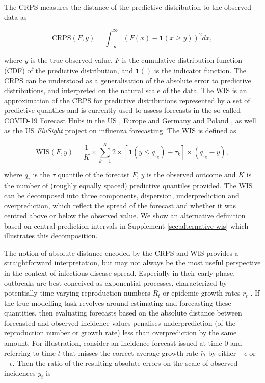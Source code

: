 \documentclass{article}
\begin{document}
The CRPS measures the distance of the predictive distribution to the observed data as 
\begin{linenomath*}
\begin{equation}
    \text{CRPS}(F, y) = \int_{-\infty}^\infty \left( F(x) - \boldsymbol{1}(x \geq y) \right)^2 dx,
\end{equation}    
\end{linenomath*}
where $y$ is the true observed value, $F$ is the cumulative distribution function (CDF) of the predictive distribution, and $\boldsymbol{1}()$ is the indicator function. The CRPS can be understood as a generalisation of the absolute error to predictive distributions, and interpreted on the natural scale of the data. The WIS is an approximation of the CRPS for predictive distributions represented by a set of predictive quantiles and is currently used to assess forecasts in the so-called COVID-19 Forecast Hubs in the US \citep{cramerCOVID19ForecastHub2020, cramerEvaluationIndividualEnsemble2021}, Europe \citep{sherrattPredictivePerformanceMultimodel2022} and Germany and Poland \citep{bracherShorttermForecastingCOVID192021, bracherNationalSubnationalShortterm2021}, as well as the US \textit{FluSight} project on influenza forecasting\citep{CdcepiFlusightforecastdata2022}. The WIS is defined as 
\begin{linenomath*}
\begin{equation}
    \text{WIS}(F, y) = \frac{1}{K} \times \sum_{k = 1}^{K} 2 \times \left[ \boldsymbol{1}(y \leq q_{\tau_k}) - \tau_k \right] \times ( q_{\tau_k} - y), 
\end{equation}
\end{linenomath*}
where $q_{\tau}$ is the $\tau$ quantile of the forecast $F$, $y$ is the observed outcome and $K$ is the number of (roughly equally spaced) predictive quantiles provided. The WIS can be decomposed into three components, dispersion, underprediction and overprediction, which reflect the spread of the forecast and whether it was centred above or below the observed value. We show an alternative definition based on central prediction intervals in Supplement \ref{sec:alternative-wis} which illustrates this decomposition. 

The notion of absolute distance encoded by the CRPS and WIS provides a straightforward interpretation, but may not always be the most useful perspective in the context of infectious disease spread. Especially in their early phase, outbreaks are best conceived as exponential processes, characterized by potentially time varying reproduction numbers $R_t$ \citep{gosticPracticalConsiderationsMeasuring2020} or epidemic growth rates $r_t$ \citep{dushoffSpeedStrengthEpidemic2021}. If the true modelling task revolves around estimating and forecasting these quantities, then evaluating forecasts based on the absolute distance between forecasted and observed incidence values penalises underprediction (of the reproduction number or growth rate) less than overprediction by the same amount. For illustration, consider an incidence forecast issued at time 0 and referring to time $t$ that misses the correct average growth rate $\bar{r}_t$ by either $-\epsilon$ or $+\epsilon$. Then the ratio of the resulting absolute errors on the scale of observed incidences $y_{t}$ is
\end{document}
